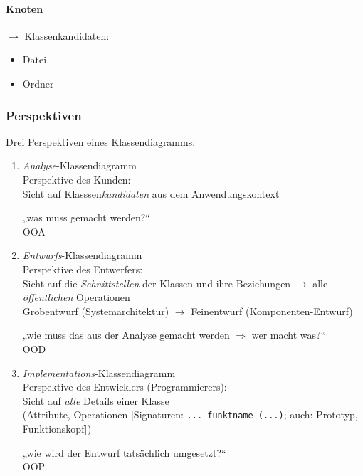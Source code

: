 \documentclass{scrreprt}
\begin{document}
\paragraph{Knoten} $\to$ Klassenkandidaten:
\begin{itemize}
	\item Datei
	\item Ordner
\end{itemize}

\subsubsection{Perspektiven}
Drei Perspektiven eines Klassendiagramms:
\begin{enumerate}
\item \emph{Analyse}-Klassendiagramm\\
Perspektive des Kunden:\\
Sicht auf Klasssen\emph{kandidaten} aus dem Anwendungskontext

„was muss gemacht werden?“\\
OOA
\item \emph{Entwurfs}-Klassendiagramm\\
Perspektive des Entwerfers:\\
Sicht auf die \emph{Schnittstellen} der Klassen und ihre Beziehungen $\to$ alle \emph{öffentlichen} Operationen\\
Grobentwurf (Systemarchitektur) $\to$ Feinentwurf (Komponenten-Entwurf)

„wie muss das aus der Analyse gemacht werden $\Rightarrow$ wer macht was?“\\
OOD
\item \emph{Implementations}-Klassendiagramm\\
Perspektive des Entwicklers (Programmierers):\\
Sicht auf \emph{alle} Details einer Klasse\\
(Attribute, Operationen [Signaturen: \lstinline$... funktname (...)$; auch: Prototyp, Funktionskopf])

„wie wird der Entwurf tatsächlich umgesetzt?“\\
OOP
\end{enumerate}
\end{document}
